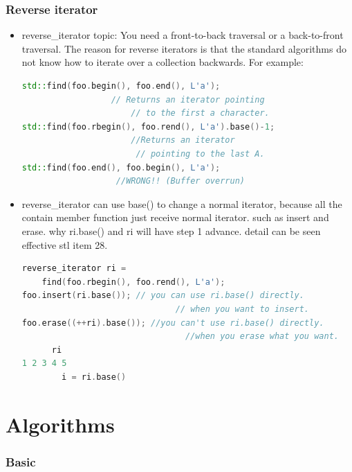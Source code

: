 \documentclass[a4paper,12pt,twoside]{book}
\begin{document}
\subsubsection{Reverse iterator}
\begin{itemize}
\item reverse\_iterator topic:
You need a front-to-back traversal or a back-to-front traversal. The reason for reverse iterators is that the standard algorithms do not know how to iterate over a collection backwards. For example:
\begin{lstlisting}[frame=single, language=c++]
std::find(foo.begin(), foo.end(), L'a');
                  // Returns an iterator pointing
                      // to the first a character.
std::find(foo.rbegin(), foo.rend(), L'a').base()-1;
                      //Returns an iterator
                       // pointing to the last A.
std::find(foo.end(), foo.begin(), L'a');
                   //WRONG!! (Buffer overrun)
\end{lstlisting}

\item reverse\_iterator can use base() to change a normal iterator, because all the contain member function just receive normal iterator. such as insert and erase.
why ri.base() and ri will have step 1 advance. detail can be seen effective stl item 28.
\begin{lstlisting}[frame=single, language=c++]
reverse_iterator ri =
    find(foo.rbegin(), foo.rend(), L'a');
foo.insert(ri.base()); // you can use ri.base() directly.
                               // when you want to insert.
foo.erase((++ri).base()); //you can't use ri.base() directly.
                                 //when you erase what you want.
      ri
1 2 3 4 5
        i = ri.base()
\end{lstlisting}



\end{itemize}

\section{Algorithms}

\subsubsection{Basic}
\end{document}
